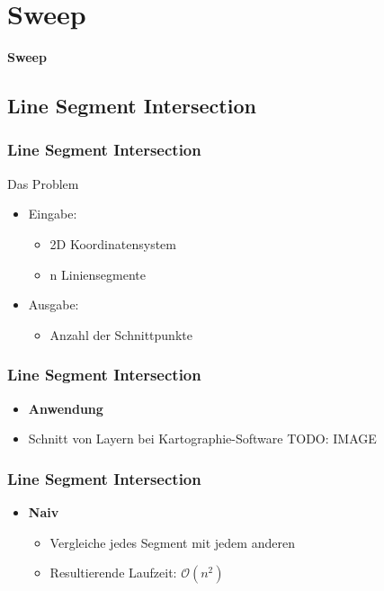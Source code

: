 \section{Sweep}
\begin{frame}
	\begin{center}
		\textbf{Sweep}
	\end{center}
\end{frame}

\subsection{Line Segment Intersection}
\begin{frame}
	\frametitle{{Line Segment Intersection}}
	\begin{block}{Das Problem}
	\begin{itemize}
		\pause
		\item{Eingabe:}
		\pause
		\begin{itemize}
			\item{2D Koordinatensystem}
			\pause
			\item{n Liniensegmente}
		\end{itemize}
		\pause
		\item{Ausgabe:}
		\pause
		\begin{itemize}
			\item{Anzahl der Schnittpunkte}
		\end{itemize}
	\end{itemize}
	\end{block}
\end{frame}
\begin{frame}
	\frametitle{{Line Segment Intersection}}
	\begin{itemize}
		\item \textbf{Anwendung}
		\pause
		\item Schnitt von Layern bei Kartographie-Software
		\pause
		TODO: IMAGE
	\end{itemize}
\end{frame}
\begin{frame}
	\frametitle{{Line Segment Intersection}}
	\begin{itemize}
		\item \textbf{Naiv}
		\begin{itemize}
			\pause
			\item{Vergleiche jedes Segment mit jedem anderen}
			\pause
			\item{Resultierende Laufzeit: $\mathcal O(n^2)$}
		\end{itemize}
	\end{itemize}
\end{frame}
